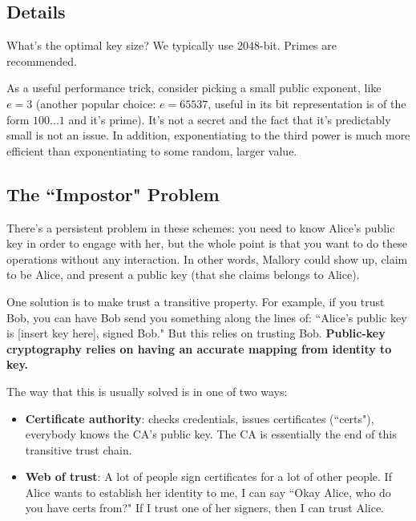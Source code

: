 \documentclass[12pt]{article}
\begin{document}
\subsection*{Details}

What's the optimal key size? We typically use 2048-bit. Primes are recommended.

As a useful performance trick, consider picking a small public exponent, like $e = 3$ (another popular choice: $e = 65537$, useful in its bit representation is of the form $100...1$ and it's prime). It's not a secret and the fact that it's predictably small is not an issue. In addition, exponentiating to the third power is much more efficient than exponentiating to some random, larger value.

\subsection*{The ``Impostor" Problem}

There's a persistent problem in these schemes: you need to know Alice's public key in order to engage with her, but the whole point is that you want to do these operations without any interaction. In other words, Mallory could show up, claim to be Alice, and present a public key (that she claims belongs to Alice).

One solution is to make trust a transitive property. For example, if you trust Bob, you can have Bob send you something along the lines of: ``Alice's public key is [insert key here], signed Bob." But this relies on trusting Bob. \textbf{Public-key cryptography relies on having an accurate mapping from identity to key.}

The way that this is usually solved is in one of two ways:
\begin{itemize}
\item \textbf{Certificate authority}: checks credentials, issues certificates (``certs"), everybody knows the CA's public key. The CA is essentially the end of this transitive trust chain.
\item \textbf{Web of trust}: A lot of people sign certificates for a lot of other people. If Alice wants to establish her identity to me, I can say ``Okay Alice, who do you have certs from?" If I trust one of her signers, then I can trust Alice.
\end{itemize}
\end{document}
